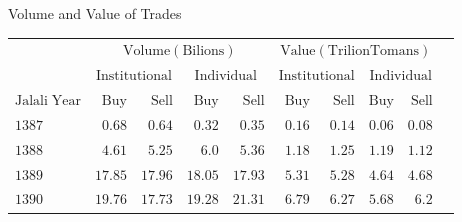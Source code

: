 \documentclass{beamer}
\begin{document}
\begin{frame}{Volume and Value of Trades}
    \centering
    \fontsize{8}{8} \selectfont
    \begin{tabular}{lrrrrrrrrr}
        \toprule
                                    & \multicolumn{4}{c}{\(\mathrm{Volume(Bilions)}\)} & \multicolumn{4}{c}{\(\mathrm{Value(Trilion Tomans)}\)}                                                                                                                                                                                          \\
        \cmidrule(l){2-5} \cmidrule(l){6-9}
                                    & \multicolumn{2}{c}{\(\mathrm{Institutional}\)}   & \multicolumn{2}{c}{\(\mathrm{Individual}\)}            & \multicolumn{2}{c}{\(\mathrm{Institutional}\)} & \multicolumn{2}{c}{\(\mathrm{Individual}\)}                                                                                           \\
        \cmidrule(l){2-3} \cmidrule(l){4-5} \cmidrule(l){6-7}\cmidrule(l){8-9}
        \(\mathrm{Jalali \; Year}\) & \(\mathrm{Buy}\)                                 & \(\mathrm{Sell}\)                                      & \(\mathrm{Buy}\)                               & \(\mathrm{Sell}\)                           & \(\mathrm{Buy}\)    & \(\mathrm{Sell}\)   & \(\mathrm{Buy}\)     & \(\mathrm{Sell}\)    \\
        \midrule
        \(\mathrm{1387}\)           & \(\mathrm{0.68}\)                                & \(\mathrm{0.64}\)                                      & \(\mathrm{0.32}\)                              & \(\mathrm{0.35}\)                           & \(\mathrm{0.16}\)   & \(\mathrm{0.14}\)   & \(\mathrm{0.06}\)    & \(\mathrm{0.08}\)    \\
        \(\mathrm{1388}\)           & \(\mathrm{4.61}\)                                & \(\mathrm{5.25}\)                                      & \(\mathrm{6.0}\)                               & \(\mathrm{5.36}\)                           & \(\mathrm{1.18}\)   & \(\mathrm{1.25}\)   & \(\mathrm{1.19}\)    & \(\mathrm{1.12}\)    \\
        \(\mathrm{1389}\)           & \(\mathrm{17.85}\)                               & \(\mathrm{17.96}\)                                     & \(\mathrm{18.05}\)                             & \(\mathrm{17.93}\)                          & \(\mathrm{5.31}\)   & \(\mathrm{5.28}\)   & \(\mathrm{4.64}\)    & \(\mathrm{4.68}\)    \\
        \(\mathrm{1390}\)           & \(\mathrm{19.76}\)                               & \(\mathrm{17.73}\)                                     & \(\mathrm{19.28}\)                             & \(\mathrm{21.31}\)                          & \(\mathrm{6.79}\)   & \(\mathrm{6.27}\)   & \(\mathrm{5.68}\)    & \(\mathrm{6.2}\)     \\

\end{tabular}
\end{frame}
\end{document}
